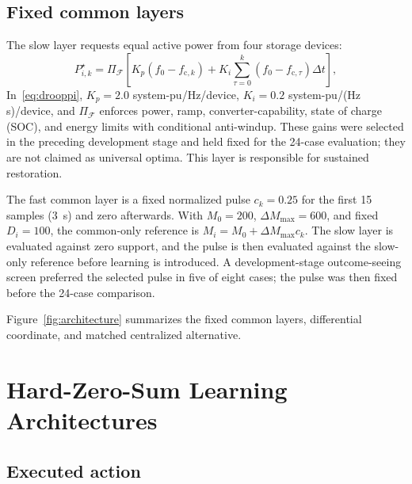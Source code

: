\documentclass[conference,a4paper]{IEEEtran}
\begin{document}
\subsection{Fixed common layers}

The slow layer requests equal active power from four storage devices:
\begin{equation}
 P^\star_{i,k}=\Pi_{\mathcal F}\!\left[
 K_p(f_0-f_{\mathrm c,k})+
 K_i\sum_{\tau=0}^{k}(f_0-f_{\mathrm c,\tau})\Delta t
 \right],
\label{eq:drooppi}
\end{equation}
In~\eqref{eq:drooppi}, \(K_p=2.0\) system-pu/Hz/device,
\(K_i=0.2\) system-pu/(Hz\,s)/device, and \(\Pi_{\mathcal F}\) enforces
power, ramp, converter-capability, state of charge (SOC), and energy limits
with conditional
anti-windup. These gains were selected in the preceding development stage and
held fixed for the 24-case evaluation; they are not claimed as universal
optima. This layer is responsible for sustained restoration.

The fast common layer is a fixed normalized pulse \(c_k=0.25\) for the first
15 samples (\SI{3}{s}) and zero afterwards. With \(M_0=200\),
\(\Delta M_{\max}=600\), and fixed \(D_i=100\), the common-only reference is
\(M_i=M_0+\Delta M_{\max}c_k\). The slow layer is evaluated against zero
support, and the pulse is then evaluated against the slow-only reference
before learning is introduced. A development-stage outcome-seeing screen
preferred the selected pulse in five of eight cases; the pulse was then fixed
before the 24-case comparison.

Figure~\ref{fig:architecture} summarizes the fixed common layers, differential
coordinate, and matched centralized alternative.


\section{Hard-Zero-Sum Learning Architectures}

\subsection{Executed action}
\end{document}
